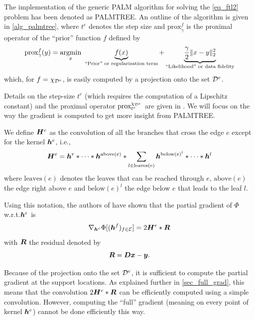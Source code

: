 The implementation of the generic \ac{PALM} algorithm for solving the \eqref{eq_ftl2} problem has been denoted as \ac{PALMTREE}. 
An outline of the algorithm is given in \cref{alg_palmtree}, where $t^e$ denotes the step size and $\text{prox}^f_\gamma$ is the proximal operator of the “prior” function $f$ defined by \begin{equation*}\text{prox}^f_\gamma(y) = \underset{x}{\operatorname{argmin}}~ \underbrace{f(x)}_{\text{“Prior” or regularization term}} + \underbrace{\frac{\gamma}{2} \lVert x - y \rVert^2_2}_{\text{“Likelihood” or data fidelity}}\end{equation*} which, for $f = \chi_{{\mathcal D}^e}$, is easily computed by a projection onto the set ${\mathcal D}^e$.

\noindent
Details on the step-size $t^e$ (which requires the computation of a Lipschitz constant) and the proximal operator $\text{prox}^{\chi_{{\mathcal D}^e}}_{t^e}$ are given in \cite{chabiron_optimization_2016}. We will focus on the way the gradient is computed to get more insight from \ac{PALMTREE}.

\noindent
We define $\bm{H}^e$ as the convolution of all the branches that cross the edge $e$ except for the kernel $\bm{h}^e$, i.e., \begin{equation*}\bm{H}^e = \bm{h}^r * \dots * \bm{h}^{\text{above}(e)}  * \sum_{l \in \text{leaves(e)}} \bm{h}^{\text{below}(e)^l} * \dots * \bm{h}^{l}\end{equation*} where $\text{leaves}(e)$ denotes the leaves that can be reached through $e$, $\text{above}(e)$  the edge right above $e$ and $\text{below}(e)^l$ the edge below $e$ that leads to the leaf $l$.

\noindent
Using this notation, the authors of \cite{chabiron_optimization_2016} have shown that the partial gradient of $\Phi$ w.r.t.\@ $\bm{h}^e$ is 
\begin{equation}\nabla_{\bm{h}^e} \Phi[(\bm{h}^f)_{f \in \mathcal E}] = 2 \bm{H}^e * \bm{R} \label{eq_gradient}\end{equation} 
with $\bm{R}$ the residual denoted by
\begin{equation*}\bm{R} = \bm{D}\bm{x} - \bm{y}. \end{equation*}

\noindent
Because of the projection onto the set ${\mathcal D}^e$, it is sufficient to compute the partial gradient at the support locations. As explained further in \cref{sec_full_grad}, this means that the convolution $2 \bm{H}^e * \bm{R}$ can be efficiently computed using a simple convolution. However, computing the “full” gradient (meaning on every point of kernel $\bm{h}^e$) cannot be done efficiently this way.

